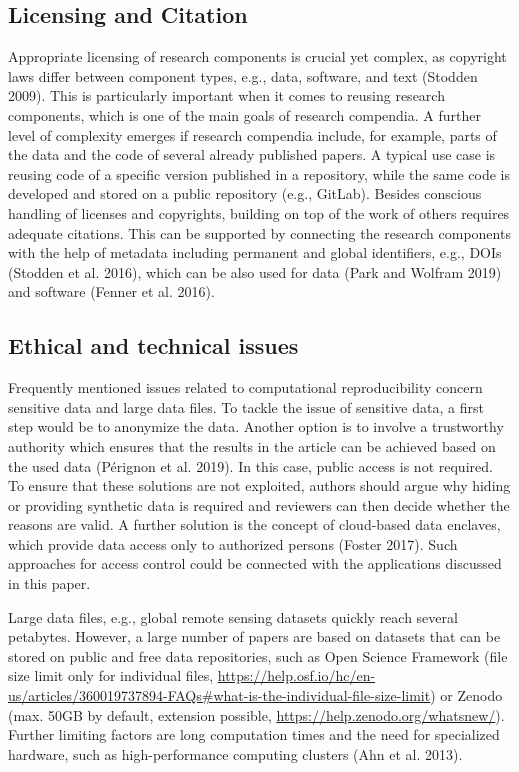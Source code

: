\documentclass[onecolumn]{article}
\begin{document}
\hypertarget{licensing-and-citation}{%
\subsection{Licensing and Citation}\label{licensing-and-citation}}

Appropriate licensing of research components is crucial yet complex, as
copyright laws differ between component types, e.g., data, software, and
text (Stodden 2009). This is particularly important when it comes to
reusing research components, which is one of the main goals of research
compendia. A further level of complexity emerges if research compendia
include, for example, parts of the data and the code of several already
published papers. A typical use case is reusing code of a specific
version published in a repository, while the same code is developed and
stored on a public repository (e.g., GitLab). Besides conscious handling
of licenses and copyrights, building on top of the work of others
requires adequate citations. This can be supported by connecting the
research components with the help of metadata including permanent and
global identifiers, e.g., DOIs (Stodden et al. 2016), which can be also
used for data (Park and Wolfram 2019) and software (Fenner et al. 2016).

\hypertarget{ethical-and-technical-issues}{%
\subsection{Ethical and technical
issues}\label{ethical-and-technical-issues}}

Frequently mentioned issues related to computational reproducibility
concern sensitive data and large data files. To tackle the issue of
sensitive data, a first step would be to anonymize the data. Another
option is to involve a trustworthy authority which ensures that the
results in the article can be achieved based on the used data (Pérignon
et al. 2019). In this case, public access is not required. To ensure
that these solutions are not exploited, authors should argue why hiding
or providing synthetic data is required and reviewers can then decide
whether the reasons are valid. A further solution is the concept of
cloud-based data enclaves, which provide data access only to authorized
persons (Foster 2017). Such approaches for access control could be
connected with the applications discussed in this paper.

Large data files, e.g., global remote sensing datasets quickly reach
several petabytes. However, a large number of papers are based on
datasets that can be stored on public and free data repositories, such
as Open Science Framework (file size limit only for individual files,
\url{https://help.osf.io/hc/en-us/articles/360019737894-FAQs\#what-is-the-individual-file-size-limit})
or Zenodo (max. 50GB by default, extension possible,
\url{https://help.zenodo.org/whatsnew/}). Further limiting factors are
long computation times and the need for specialized hardware, such as
high-performance computing clusters (Ahn et al. 2013).
\end{document}
